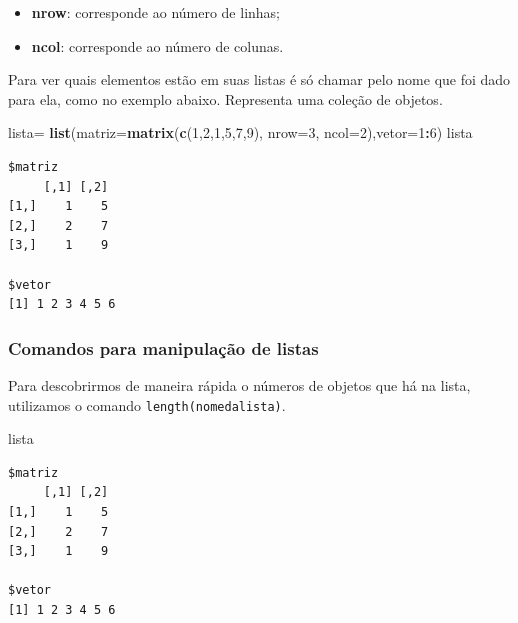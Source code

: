 \documentclass[12pt,brazil,]{book}
\newenvironment{Shaded}{\begin{snugshade}}{\end{snugshade}}
\newcommand{\DataTypeTok}[1]{\textcolor[rgb]{0.13,0.29,0.53}{#1}}
\newcommand{\DecValTok}[1]{\textcolor[rgb]{0.00,0.00,0.81}{#1}}
\newcommand{\KeywordTok}[1]{\textcolor[rgb]{0.13,0.29,0.53}{\textbf{#1}}}
\newcommand{\NormalTok}[1]{#1}
\newcommand{\OperatorTok}[1]{\textcolor[rgb]{0.81,0.36,0.00}{\textbf{#1}}}
\newcommand{\StringTok}[1]{\textcolor[rgb]{0.31,0.60,0.02}{#1}}
\providecommand{\tightlist}{%
  \setlength{\itemsep}{0pt}\setlength{\parskip}{0pt}}
\begin{document}
\begin{itemize}
\tightlist
\item
  \textbf{nrow}: corresponde ao número de linhas;
\item
  \textbf{ncol}: corresponde ao número de colunas.
\end{itemize}

Para ver quais elementos estão em suas listas é só chamar pelo nome que
foi dado para ela, como no exemplo abaixo. Representa uma coleção de
objetos.

\begin{Shaded}
\begin{Highlighting}[]
\NormalTok{lista=}\StringTok{ }\KeywordTok{list}\NormalTok{(}\DataTypeTok{matriz=}\KeywordTok{matrix}\NormalTok{(}\KeywordTok{c}\NormalTok{(}\DecValTok{1}\NormalTok{,}\DecValTok{2}\NormalTok{,}\DecValTok{1}\NormalTok{,}\DecValTok{5}\NormalTok{,}\DecValTok{7}\NormalTok{,}\DecValTok{9}\NormalTok{), }\DataTypeTok{nrow=}\DecValTok{3}\NormalTok{, }\DataTypeTok{ncol=}\DecValTok{2}\NormalTok{),}\DataTypeTok{vetor=}\DecValTok{1}\OperatorTok{:}\DecValTok{6}\NormalTok{)}
\NormalTok{lista}
\end{Highlighting}
\end{Shaded}

\begin{verbatim}
$matriz
     [,1] [,2]
[1,]    1    5
[2,]    2    7
[3,]    1    9

$vetor
[1] 1 2 3 4 5 6
\end{verbatim}

\hypertarget{comandos-para-manipulacao-de-listas}{%
\subsubsection{Comandos para manipulação de
listas}\label{comandos-para-manipulacao-de-listas}}

Para descobrirmos de maneira rápida o números de objetos que há na
lista, utilizamos o comando \texttt{length(nomedalista)}.

\begin{Shaded}
\begin{Highlighting}[]
\NormalTok{lista}
\end{Highlighting}
\end{Shaded}

\begin{verbatim}
$matriz
     [,1] [,2]
[1,]    1    5
[2,]    2    7
[3,]    1    9

$vetor
[1] 1 2 3 4 5 6
\end{verbatim}
\end{document}
